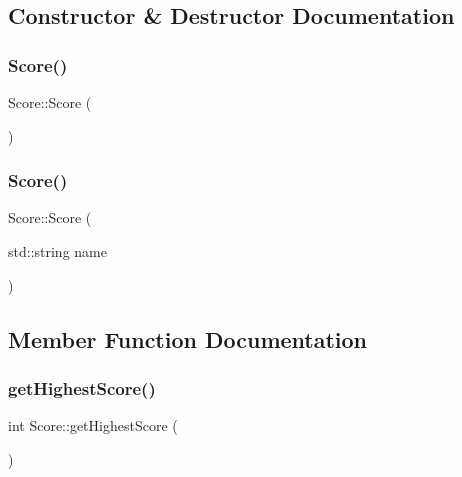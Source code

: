 \subsection{Constructor \& Destructor Documentation}
\mbox{\label{class_score_a039c99843551e5e4b512ecee99e46617}} 
\subsubsection{\texorpdfstring{Score()}{Score()}\hspace{0.1cm}{\footnotesize\ttfamily [1/2]}}
{\footnotesize\ttfamily Score\+::\+Score (\begin{DoxyParamCaption}{ }\end{DoxyParamCaption})}

\mbox{\label{class_score_a7511b13acf59479d50c2c202d579168c}} 
\subsubsection{\texorpdfstring{Score()}{Score()}\hspace{0.1cm}{\footnotesize\ttfamily [2/2]}}
{\footnotesize\ttfamily Score\+::\+Score (\begin{DoxyParamCaption}\item[{std\+::string}]{name }\end{DoxyParamCaption})}



\subsection{Member Function Documentation}
\mbox{\label{class_score_afb50f4e2cb31006d23d3281dd1703880}} 
\subsubsection{\texorpdfstring{get\+Highest\+Score()}{getHighestScore()}}
{\footnotesize\ttfamily int Score\+::get\+Highest\+Score (\begin{DoxyParamCaption}{ }\end{DoxyParamCaption})}


